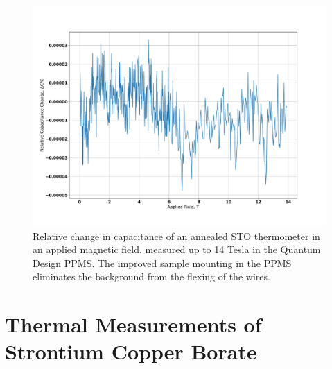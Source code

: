 \documentclass{thesis-umich}
\begin{document}
\begin{figure} \caption[Field response of an annealed STO thermometer]{Relative change in capacitance of an annealed STO
	thermometer in an applied magnetic field, measured up to 14 Tesla in
the Quantum Design PPMS. The improved sample mounting in the PPMS eliminates
the background from the flexing of the wires.}
\includegraphics[width=\columnwidth]{figures/annealed_sto_dc_vs_b.pdf}
\end{figure}
	
\chapter{Thermal Measurements of Strontium Copper Borate}
\end{document}
